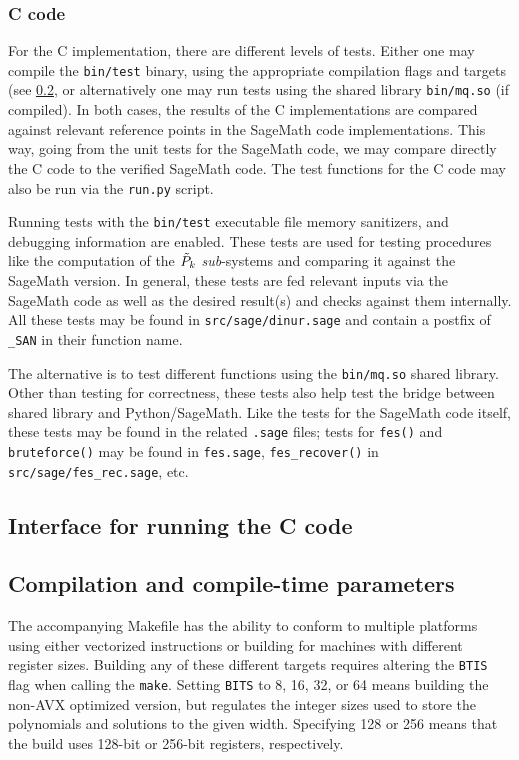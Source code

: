 \subsubsection{C code}

For the C implementation, there are different levels of tests. Either one may compile the \texttt{bin/test} binary, using the appropriate compilation flags and targets (see \cref{sec:impl:compile}, or alternatively one may run tests using the shared library \texttt{bin/mq.so} (if compiled). In both cases, the results of the C implementations are compared against relevant reference points in the SageMath code implementations. This way, going from the unit tests for the SageMath code, we may compare directly the C code to the verified SageMath code. The test functions for the C code may also be run via the \texttt{run.py} script.

Running tests with the \texttt{bin/test} executable file memory sanitizers, and debugging information are enabled. These tests are used for testing procedures like the computation of the $\Tilde{P}_k$ \textit{sub}-systems and comparing it against the SageMath version. In general, these tests are fed relevant inputs via the SageMath code as well as the desired result(s) and checks against them internally. All these tests may be found in \texttt{src/sage/dinur.sage} and contain a postfix of \texttt{\_SAN} in their function name.

The alternative is to test different functions using the \texttt{bin/mq.so} shared library. Other than testing for correctness, these tests also help test the bridge between shared library and Python/SageMath. Like the tests for the SageMath code itself, these tests may be found in the related \texttt{.sage} files; tests for \texttt{fes()} and \texttt{bruteforce()} may be found in \texttt{fes.sage}, \texttt{fes\_recover()} in \texttt{src/sage/fes\_rec.sage}, etc.

\subsection{Interface for running the C code} \label{sec:impl:interface}


\subsection{Compilation and compile-time parameters} \label{sec:impl:compile}
The accompanying Makefile has the ability to conform to multiple platforms using either vectorized instructions or building for machines with different register sizes. Building any of these different targets requires altering the \texttt{BTIS} flag when calling the \texttt{make}. Setting \texttt{BITS} to 8, 16, 32, or 64 means building the non-AVX optimized version, but regulates the integer sizes used to store the polynomials and solutions to the given width. Specifying 128 or 256 means that the build uses 128-bit or 256-bit registers, respectively. 

